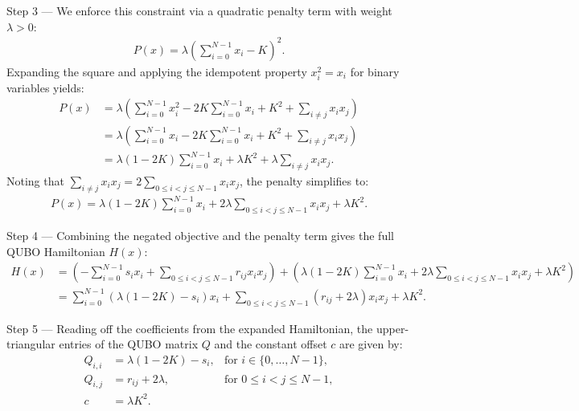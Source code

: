 \documentclass[12pt]{article}
\begin{document}
Step 3 --- We enforce this constraint via a quadratic penalty term with weight $\lambda > 0$:
\begin{align}
  P(x) = \lambda \left( \sum_{i=0}^{N-1} x_i - K \right)^2.
\end{align}
Expanding the square and applying the idempotent property $x_i^2 = x_i$ for binary variables yields:
\begin{align}
  P(x) &= \lambda \left( \sum_{i=0}^{N-1} x_i^2 - 2K \sum_{i=0}^{N-1} x_i + K^2 + \sum_{i \neq j} x_i x_j \right) \\
  &= \lambda \left( \sum_{i=0}^{N-1} x_i - 2K \sum_{i=0}^{N-1} x_i + K^2 + \sum_{i \neq j} x_i x_j \right) \\
  &= \lambda (1 - 2K) \sum_{i=0}^{N-1} x_i + \lambda K^2 + \lambda \sum_{i \neq j} x_i x_j.
\end{align}
Noting that $\sum_{i \neq j} x_i x_j = 2 \sum_{0 \le i < j \le N-1} x_i x_j$, the penalty simplifies to:
\begin{align}
  P(x) = \lambda (1 - 2K) \sum_{i=0}^{N-1} x_i + 2\lambda \sum_{0 \le i < j \le N-1} x_i x_j + \lambda K^2.
\end{align}

Step 4 --- Combining the negated objective and the penalty term gives the full QUBO Hamiltonian $H(x)$:
\begin{align}
  H(x) &= \left( -\sum_{i=0}^{N-1} s_i x_i + \sum_{0 \le i < j \le N-1} r_{ij} x_i x_j \right) + \left( \lambda (1 - 2K) \sum_{i=0}^{N-1} x_i + 2\lambda \sum_{0 \le i < j \le N-1} x_i x_j + \lambda K^2 \right) \\
  &= \sum_{i=0}^{N-1} \left( \lambda (1 - 2K) - s_i \right) x_i + \sum_{0 \le i < j \le N-1} \left( r_{ij} + 2\lambda \right) x_i x_j + \lambda K^2.
\end{align}

Step 5 --- Reading off the coefficients from the expanded Hamiltonian, the upper-triangular entries of the QUBO matrix $Q$ and the constant offset $c$ are given by:
\begin{align}
  Q_{i,i} &= \lambda (1 - 2K) - s_i, & \text{for } i \in \{0, \dots, N-1\}, \\
  Q_{i,j} &= r_{ij} + 2\lambda, & \text{for } 0 \le i < j \le N-1, \\
  c &= \lambda K^2.
\end{align}
\end{document}
